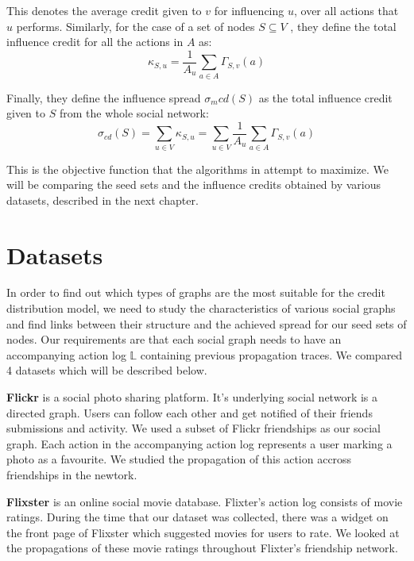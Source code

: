 \documentclass{acm_proc_article-sp}
\begin{document}
\noindent This denotes the average credit given to $v$ for influencing $u$, over all actions that $u$ performs. Similarly, for the case of a set of nodes $S \subseteq V$ , they define the total influence credit for all the actions in $A$ as:
\begin{equation}
		\kappa_{S,u} = \frac{1}{A_u} \displaystyle\sum_{a \in A} \Gamma_{S,v}(a)
\end{equation}

\noindent Finally, they define the influence spread $\sigma_m{cd}(S)$ as the total influence credit given to $S$ from the whole social network:
\begin{equation}
	\sigma_{cd}(S) = \displaystyle\sum_{u\in V} \kappa_{S,u} = \displaystyle\sum_{u\in V} \frac{1}{A_u} \displaystyle\sum_{a \in A} \Gamma_{S,v}(a)
\end{equation}

This is the objective function that the algorithms in \cite{goyal:datainfluence} attempt to maximize. We will be comparing the seed sets and the influence credits obtained by various datasets, described in the next chapter.



\section{Datasets}

In order to find out which types of graphs are the most suitable for the credit distribution model, we need to study the characteristics of various social graphs and find links between their structure and the achieved spread for our seed sets of nodes. Our requirements are that each social graph needs to have an accompanying action log $\mathbb{L}$ containing previous propagation traces. We compared 4 datasets which will be described below.

\textbf{Flickr} \cite{data:flickr} is a social photo sharing platform. It's underlying social network is a directed graph. Users can follow each other and get notified of their friends submissions and activity. We used a subset of Flickr friendships as our social graph. Each action in the accompanying action log represents a user marking a photo as a favourite. We studied the propagation of this action accross friendships in the newtork. \cite{data:flickr-paper}

\textbf{Flixster} \cite{data:flixster} is an online social movie database. Flixter's action log consists of movie ratings. During the time that our dataset was collected, there was a widget on the front page of Flixster which suggested movies for users to rate. We looked at the propagations of these movie ratings throughout Flixter's friendship network. \cite{data:flixsterpaper}
\end{document}
